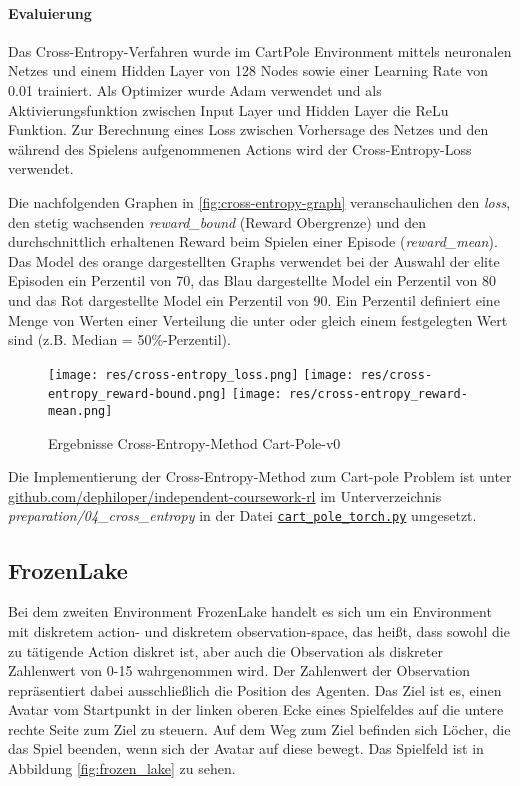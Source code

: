 \documentclass[11pt]{scrartcl}
\begin{document}
\paragraph*{Evaluierung}
\noindent
\newline
Das Cross-Entropy-Verfahren wurde im CartPole Environment mittels neuronalen Netzes und
einem Hidden Layer von 128 Nodes sowie einer Learning Rate von 0.01 trainiert. Als
Optimizer wurde Adam verwendet und als Aktivierungsfunktion zwischen Input Layer und
Hidden Layer die ReLu Funktion. Zur Berechnung eines Loss zwischen Vorhersage des Netzes
und den während des Spielens aufgenommenen Actions wird der Cross-Entropy-Loss verwendet.

Die nachfolgenden Graphen in \autoref{fig:cross-entropy-graph} veranschaulichen den
\textit{loss}, den stetig wachsenden \textit{reward\_bound} (Reward Obergrenze) und den
durchschnittlich erhaltenen Reward beim Spielen einer Episode (\textit{reward\_mean}).
Das Model des orange dargestellten Graphs verwendet bei der Auswahl der elite Episoden
ein Perzentil von 70, das Blau dargestellte Model ein Perzentil von 80 und das Rot
dargestellte Model ein Perzentil von 90. Ein Perzentil definiert eine Menge von Werten
einer Verteilung die unter oder gleich einem festgelegten Wert sind (z.B. Median = 
50\%-Perzentil). 

\begin{figure}[htp]
\centering
\texttt{[image: res/cross-entropy\_loss.png]}
\texttt{[image: res/cross-entropy\_reward-bound.png]}
\texttt{[image: res/cross-entropy\_reward-mean.png]}
\caption{Ergebnisse Cross-Entropy-Method Cart-Pole-v0}
\label{fig:cross-entropy-graph}
\end{figure}

Die Implementierung der Cross-Entropy-Method zum Cart-pole Problem ist unter
\url{github.com/dephiloper/independent-coursework-rl} im Unterverzeichnis 
\textit{preparation/04\_cross\_entropy} in der Datei
\href{https://github.com/dephiloper/independent-coursework-rl/blob/master/preparation/04_cross_entropy/cart_pole_torch.py}{\nolinkurl{cart\_pole\_torch.py}} umgesetzt.


\subsection{FrozenLake}
\label{sec:frozen-lake}
Bei dem zweiten Environment FrozenLake handelt es sich um ein Environment mit diskretem action-
und diskretem observation-space, das heißt, dass sowohl die zu tätigende Action diskret ist,
aber auch die Observation als diskreter Zahlenwert von 0-15 wahrgenommen wird. Der Zahlenwert
der Observation repräsentiert dabei ausschließlich die Position des Agenten. Das Ziel ist es,
einen Avatar vom Startpunkt in der linken oberen Ecke eines Spielfeldes auf die untere rechte
Seite zum Ziel zu steuern. Auf dem Weg zum Ziel befinden sich Löcher, die das Spiel beenden, wenn
sich der Avatar auf diese bewegt. Das Spielfeld ist in Abbildung \ref{fig:frozen_lake} zu sehen.
\end{document}
